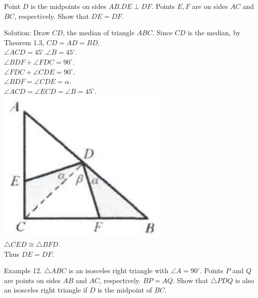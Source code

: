 \documentclass[10pt]{article}
\begin{document}
Point \(D\) is the midpoints on sides \(A B . D E \perp D F\). Points \(E, F\) are on sides \(A C\) and \(B C\), respectively. Show that \(D E=D F\).

Solution:
Draw \(C D\), the median of triangle \(A B C\). Since \(C D\) is the median, by Theorem 1.3, \(C D=A D=B D\).\\
\(\angle A C D=45^{\circ} . \angle B=45^{\circ}\).\\
\(\angle B D F+\angle F D C=90^{\circ}\).\\
\(\angle F D C+\angle C D E=90^{\circ}\).\\
\(\angle B D F=\angle C D E=\alpha\).\\
\(\angle A C D=\angle E C D=\angle B=45^{\circ}\).\\
\includegraphics[max width=\textwidth, center]{2025_04_17_97bc1f7e44d93c271a88g-013}\\
\(\triangle C E D \cong \triangle B F D\).\\
Thus \(D E=D F\).

Example 12. \(\triangle A B C\) is an isosceles right triangle with \(\angle A=90^{\circ}\). Points \(P\) and \(Q\) are points on sides \(A B\) and \(A C\), respectively. \(B P=A Q\). Show that \(\triangle P D Q\) is also an isosceles right triangle if \(D\) is the midpoint of \(B C\).
\end{document}
